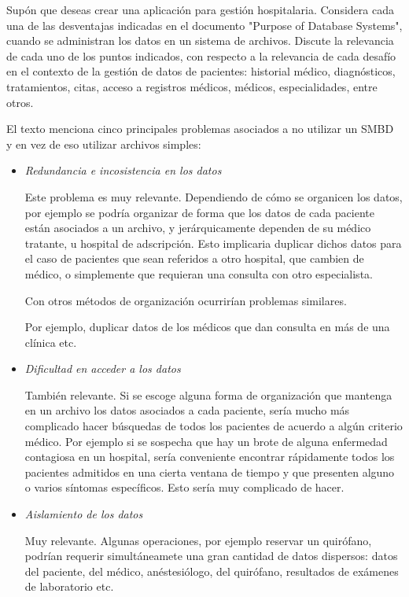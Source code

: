 \item Supón que deseas crear una aplicación para gestión hospitalaria. Considera cada una de las desventajas indicadas en el documento "Purpose of Database Systems", cuando se administran los datos en un sistema de archivos. Discute la relevancia de cada uno de los puntos indicados, con respecto a la relevancia de cada desafío en el contexto de la gestión de datos de pacientes: historial médico, diagnósticos, tratamientos, citas, acceso a registros médicos, médicos, especialidades, entre otros.

El texto menciona cinco principales problemas asociados a no utilizar un SMBD y en vez de eso utilizar archivos simples:

\begin{itemize}
	\item \emph{Redundancia e incosistencia en los datos}

	      Este problema es muy relevante. Dependiendo de cómo se organicen los datos, por ejemplo se podría organizar de forma que los datos de cada paciente están asociados a un archivo, y jerárquicamente dependen de su médico tratante, u hospital de adscripción. Esto implicaria duplicar dichos datos para el caso de pacientes que sean referidos a otro hospital, que cambien de médico, o simplemente que requieran una consulta con otro especialista.

	      Con otros métodos de organización ocurrirían problemas similares.

	      Por ejemplo, duplicar datos de los médicos que dan consulta en más de una clínica etc.

	\item \emph{Dificultad en acceder a los datos}

	      También relevante. Si se escoge alguna forma de organización que mantenga en un archivo los datos asociados a cada paciente, sería mucho más complicado hacer búsquedas de todos los pacientes de acuerdo a algún criterio médico. Por ejemplo si se sospecha que hay un brote de alguna enfermedad contagiosa en un hospital, sería conveniente encontrar rápidamente todos los pacientes admitidos en una cierta ventana de tiempo y que presenten alguno o varios síntomas específicos.
	      Esto sería muy complicado de hacer.

	\item \emph{Aislamiento de los datos}

	      Muy relevante. Algunas operaciones, por ejemplo reservar un quirófano, podrían requerir simultáneamete una gran cantidad de datos dispersos: datos del paciente, del médico, anéstesiólogo, del quirófano, resultados de exámenes de laboratorio etc.



\end{itemize}
